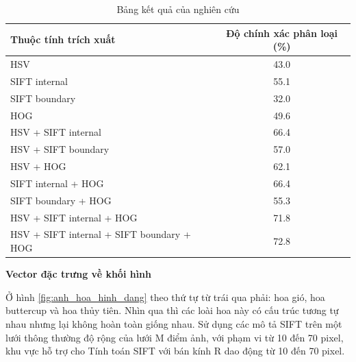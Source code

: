 \documentclass[12pt]{report}
\begin{document}
																																														
		\begin{table}[h]
			\centering
			\caption{Bảng kết quả của nghiên cứu \cite{cia-Nilsback08}}
			\label{tbl:table ket qua cua Nilsback08}
			\begin{tabular}{|l|c|}
				\hline
				\textbf{Thuộc tính trích xuất}      & \textbf{Độ chính xác phân loại (\%)} \\ \hline
				HSV                                       & 43.0                                         \\ \hline
				SIFT internal                             & 55.1                                         \\ \hline
				SIFT boundary                             & 32.0                                         \\ \hline
				HOG                                       & 49.6                                         \\ \hline
				HSV + SIFT internal                       & 66.4                                         \\ \hline
				HSV + SIFT boundary                       & 57.0                                         \\ \hline
				HSV + HOG                                 & 62.1                                         \\ \hline
				SIFT internal + HOG                       & 66.4                                         \\ \hline
				SIFT boundary + HOG                       & 55.3                                         \\ \hline
				HSV + SIFT internal + HOG                 & 71.8                                         \\ \hline
				HSV + SIFT internal + SIFT boundary + HOG & 72.8                                         \\ \hline
																																																																																												
			\end{tabular}
		\end{table}
																																																
																																								
		\textbf{Vector đặc trưng về khối hình}
																																		
		Ở hình \ref{fig:anh_hoa_hinh_dang} theo thứ tự từ trái qua phải: hoa gió, hoa buttercup và hoa thủy tiên. Nhìn qua thì các loài hoa này có cấu trúc tương tự nhau nhưng lại không hoàn toàn giống nhau. Sử dụng các mô tả SIFT \cite{cia_SIFT} trên một lưới thông thường độ rộng của lưới M điểm ảnh, với phạm vi từ 10 đến 70 pixel, khu vực hỗ trợ cho Tính toán SIFT với bán kính R dao động từ 10 đến 70 pixel.				 
																																											
\end{document}
